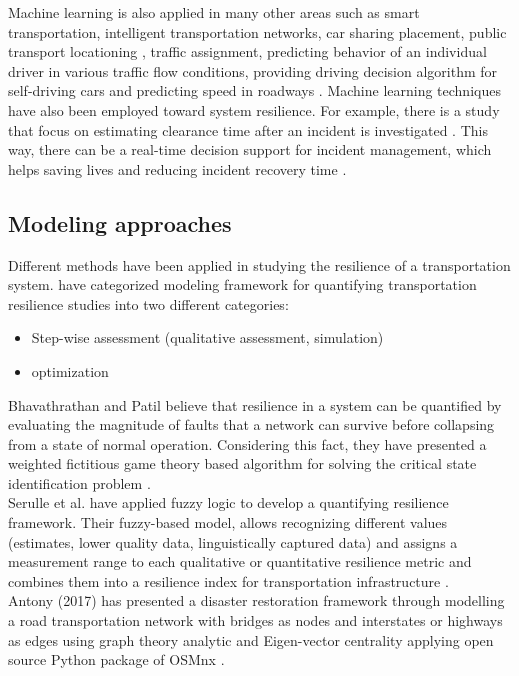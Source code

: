 \documentclass[11pt,twoside]{article}
\numberwithin{equation}{section}
\newcommand{\?}{\stackrel{?}{=}}
\begin{document}
Machine learning is also applied in many other areas such as smart transportation, intelligent transportation networks,
car sharing placement, public transport locationing \citep{tizghadam2019machine}, traffic assignment, predicting
behavior of an individual driver in various traffic flow conditions, providing driving decision algorithm for
self-driving cars and predicting speed in roadways \citep{bhavsar2017chapter}.  Machine learning techniques have also
been employed toward system resilience. For example, there is a study that focus on estimating clearance time after an
incident is investigated \citep{tang2020statistical}. This way, there can be a real-time decision support for incident
management, which helps saving lives and reducing incident recovery time \citep{bhavsar2017chapter}.


\subsection{Modeling approaches}
Different methods have been applied in studying the resilience of a transportation system. \citet{ahmed2020resilience}
have categorized modeling framework for quantifying transportation resilience studies into two different categories:
 \begin{itemize}
   \item Step-wise assessment (qualitative assessment, simulation)
   \item optimization
 \end{itemize}
 Bhavathrathan and Patil believe that resilience in a system can be quantified by evaluating the magnitude of faults that a network can survive before collapsing from a state of normal operation. Considering this fact, they have presented a weighted fictitious game theory based algorithm for solving the critical state identification problem \citep{bhavathrathan2018algorithm}.\\
 Serulle et al. have applied fuzzy logic to develop a quantifying resilience framework. Their fuzzy-based model, allows recognizing different values (estimates, lower quality data, linguistically captured data) and assigns a measurement range to each qualitative or quantitative resilience metric and combines them into a resilience index for transportation infrastructure \citep{serulle2011resiliency}.\\
 Antony (2017) has presented a disaster restoration framework through modelling a road transportation network with bridges as nodes and interstates or highways as edges using graph theory analytic and Eigen-vector centrality applying  open source Python package of OSMnx \citep{antony2017developing}.\\
\end{document}
